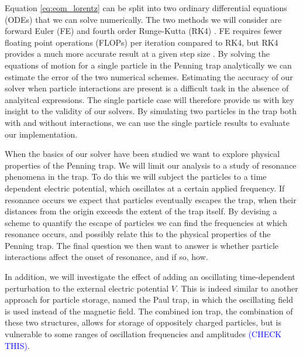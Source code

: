 
Equation \eqref{eq:eom_lorentz} can be split into two ordinary differential equations (ODEs) that we can solve numerically. The two methods we will consider are forward Euler (FE) and fourth order Runge-Kutta (RK4) . FE requires fewer floating point operations (FLOPs) per iteration compared to RK4, but RK4 provides a much more accurate result at a given step size . By solving the equations of motion for a single particle in the Penning trap analytically we can estimate the error of the two numerical schemes. Estimating the accuracy of our solver when particle interactions are present is a difficult task in the absence of analyitcal expressions. The single particle case will therefore provide us with key insight to the validity of our solvers. By simulating two particles in the trap both with and without interactions, we can use the single particle results to evaluate our implementation.   



When the basics of our solver have been studied we want to explore physical properties of the Penning trap. We will limit our analysis to a study of resonance phenomena in the trap. To do this we will subject the particles to a time dependent electric potential, which oscillates at a certain applied frequency. If resonance occurs we expect that particles eventually escapes the trap, when their distances from the origin exceeds the extent of the trap itself. By devising a scheme to quantify the escape of particles we can find the frequencies at which resonance occurs, and possibly relate this to the physical properties  of the Penning trap. The final question we then want to answer is whether particle interactions affect the onset of resonance, and if so, how.                



In addition, we will investigate the effect of adding an oscillating time-dependent perturbation to the external electric potential $V$. This is indeed similar to another approach for particle storage, named the Paul trap, in which the oscillating field is used instead of the magnetic field. The combined ion trap, the combination of these two structures, allows for storage of oppositely charged particles, but is vulnerable to some ranges of oscillation frequencies and amplitudes \textcolor{blue}{(CHECK THIS)}.



